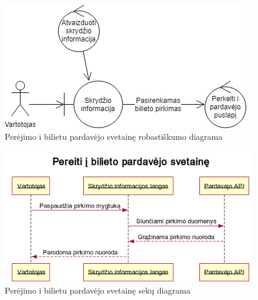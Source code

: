 \documentclass{VUMIFPSkursinis}
\begin{document}
\begin{enumerate}[label=\textbf{U\arabic*}.]
                    \begin{figure}[H]
                        \centering
                        \includegraphics[scale=0.8]{img/ROBbuy}
                        \caption{Perėjimo i bilietu pardavėjo svetainę robastiškumo diagrama}
                        \label{home_page_one_way}
                    \end{figure}

                    \begin{figure}[H]
                        \centering
                        \includegraphics[scale=0.8]{img/seqBuy}
                        \caption{Perėjimo i bilietu pardavėjo svetainę sekų diagrama}
                        \label{home_page_one_way}
                    \end{figure}


\end{enumerate}
\end{document}
